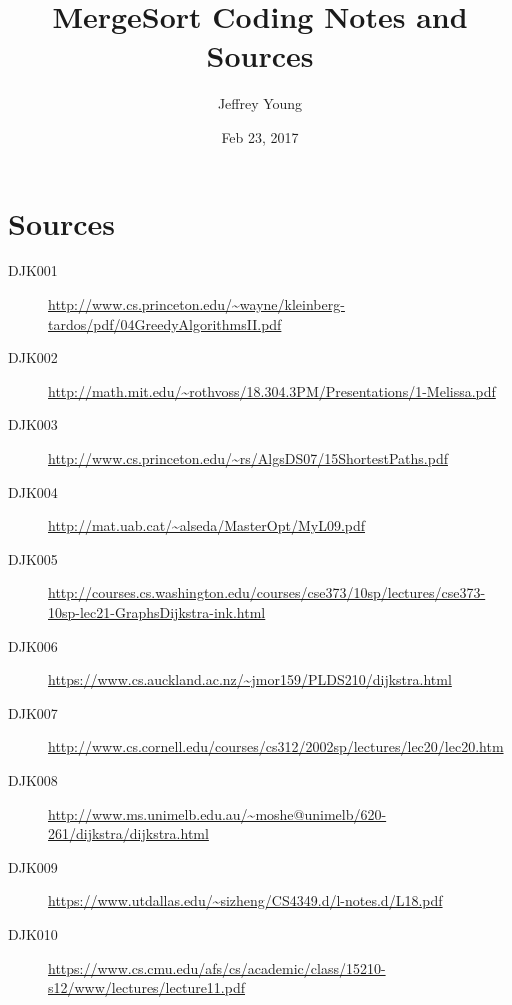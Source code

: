 \documentclass[10pt, letterpaper]{article}
\author{Jeffrey Young}
\date{Feb 23, 2017}
\title{MergeSort Coding Notes and Sources}
\begin{document}
\maketitle

\section*{Sources}
\label{sec:org5a8068d}
\begin{description}
\item[{DJK001}] \url{http://www.cs.princeton.edu/\~wayne/kleinberg-tardos/pdf/04GreedyAlgorithmsII.pdf}
\item[{DJK002}] \url{http://math.mit.edu/\~rothvoss/18.304.3PM/Presentations/1-Melissa.pdf}
\item[{DJK003}] \url{http://www.cs.princeton.edu/\~rs/AlgsDS07/15ShortestPaths.pdf}
\item[{DJK004}] \url{http://mat.uab.cat/\~alseda/MasterOpt/MyL09.pdf}
\item[{DJK005}] \url{http://courses.cs.washington.edu/courses/cse373/10sp/lectures/cse373-10sp-lec21-GraphsDijkstra-ink.html}
\item[{DJK006}] \url{https://www.cs.auckland.ac.nz/\~jmor159/PLDS210/dijkstra.html}
\item[{DJK007}] \url{http://www.cs.cornell.edu/courses/cs312/2002sp/lectures/lec20/lec20.htm}
\item[{DJK008}] \url{http://www.ms.unimelb.edu.au/\~moshe@unimelb/620-261/dijkstra/dijkstra.html}
\item[{DJK009}] \url{https://www.utdallas.edu/\~sizheng/CS4349.d/l-notes.d/L18.pdf}
\item[{DJK010}] \url{https://www.cs.cmu.edu/afs/cs/academic/class/15210-s12/www/lectures/lecture11.pdf}
\end{description}
\end{document}

